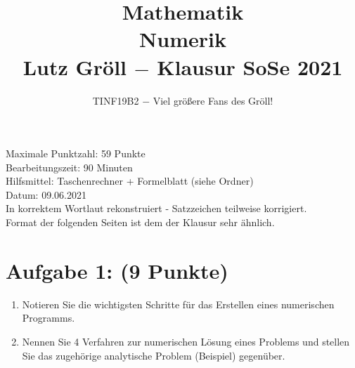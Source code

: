 \documentclass[12pt]{article}
\title{Mathematik \rom{4} \\ Numerik \\ Lutz Gröll $-$ Klausur  SoSe 2021}
\author{TINF19B2 $-$ Viel größere Fans des Gröll!}
\begin{document}
\maketitle

\begin{center}
	\large
	\vspace*{9cm}
 	Maximale Punktzahl: 59 Punkte\\
	\vspace*{1cm}
	Bearbeitungszeit: 90 Minuten\\
	\vspace*{1cm}
	Hilfsmittel: Taschenrechner + Formelblatt (siehe Ordner)\\
	\vspace*{1cm}
	Datum: 09.06.2021\\
	\vspace*{1cm}
	\small In korrektem Wortlaut rekonstruiert - Satzzeichen teilweise korrigiert.\\Format der folgenden Seiten ist dem der Klausur sehr ähnlich.\\
\end{center}
\pagebreak



\section*{Aufgabe 1: (9 Punkte)}

\begin{enumerate}
	\item Notieren Sie die wichtigsten Schritte für das Erstellen eines numerischen Programms.
	
	\vspace{9cm}
	
	\item Nennen Sie 4 Verfahren zur numerischen Lösung eines Problems und stellen Sie das zugehörige analytische Problem (Beispiel) gegenüber.

\end{enumerate}

\pagebreak
\end{document}
